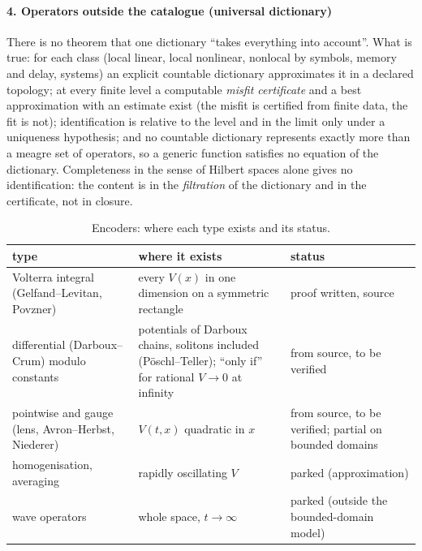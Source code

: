 \documentclass[11pt]{article}
\theoremstyle{plain}
\theoremstyle{definition}
\theoremstyle{remark}
\begin{document}
\paragraph{4. Operators outside the catalogue (universal dictionary)} There is no theorem that one dictionary ``takes everything into account''. What is true: for each class (local linear, local nonlinear, nonlocal by symbols, memory and delay, systems) an explicit countable dictionary approximates it in a declared topology;
at every finite level a computable \emph{misfit certificate} and a best approximation with an estimate exist (the misfit is certified from finite data, the fit is not); identification is relative to the level and in the limit only under a uniqueness hypothesis; and no countable dictionary represents exactly more than a meagre set of operators, so a generic function satisfies no equation of the dictionary.
Completeness in the sense of Hilbert spaces alone gives no identification: the content is in the \emph{filtration} of the dictionary and in the certificate, not in closure.

\begin{table}[tbp]
\centering\small
\caption{Encoders: where each type exists and its status.}\label{tab:encoders}
\begin{tabular}{@{}p{4.4cm}p{5.3cm}p{2.3cm}@{}}
\toprule
type & where it exists & status\\
\midrule
Volterra integral (Gelfand--Levitan, Povzner) & every $V(x)$ in one dimension on a symmetric rectangle & proof written, source\\
differential (Darboux--Crum) modulo constants & potentials of Darboux chains, solitons included (P\"oschl--Teller); ``only if'' for rational $V\to0$ at infinity & from source, to be verified\\
pointwise and gauge (lens, Avron--Herbst, Niederer) & $V(t,x)$ quadratic in $x$ & from source, to be verified; partial on bounded domains\\
homogenisation, averaging & rapidly oscillating $V$ & parked (approximation)\\
wave operators & whole space, $t\to\infty$ & parked (outside the bounded-domain model)\\
\bottomrule
\end{tabular}
\end{table}
\end{document}
